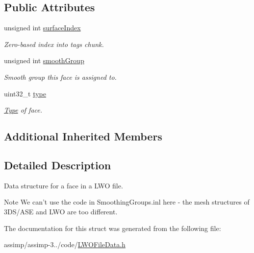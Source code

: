 \subsection*{Public Attributes}
\begin{DoxyCompactItemize}
\item 
\hypertarget{struct_assimp_1_1_l_w_o_1_1_face_ae5ac613bceddc7aaf7ac193f92315673}{unsigned int \hyperlink{struct_assimp_1_1_l_w_o_1_1_face_ae5ac613bceddc7aaf7ac193f92315673}{surface\+Index}}\label{struct_assimp_1_1_l_w_o_1_1_face_ae5ac613bceddc7aaf7ac193f92315673}

\begin{DoxyCompactList}\small\item\em Zero-\/based index into tags chunk. \end{DoxyCompactList}\item 
\hypertarget{struct_assimp_1_1_l_w_o_1_1_face_a7a18e1e72890583549f36d1fa4a023f8}{unsigned int \hyperlink{struct_assimp_1_1_l_w_o_1_1_face_a7a18e1e72890583549f36d1fa4a023f8}{smooth\+Group}}\label{struct_assimp_1_1_l_w_o_1_1_face_a7a18e1e72890583549f36d1fa4a023f8}

\begin{DoxyCompactList}\small\item\em Smooth group this face is assigned to. \end{DoxyCompactList}\item 
\hypertarget{struct_assimp_1_1_l_w_o_1_1_face_a7cc7b1645606341a7924a9057c3b8d47}{uint32\+\_\+t \hyperlink{struct_assimp_1_1_l_w_o_1_1_face_a7cc7b1645606341a7924a9057c3b8d47}{type}}\label{struct_assimp_1_1_l_w_o_1_1_face_a7cc7b1645606341a7924a9057c3b8d47}

\begin{DoxyCompactList}\small\item\em \hyperlink{struct_type}{Type} of face. \end{DoxyCompactList}\end{DoxyCompactItemize}
\subsection*{Additional Inherited Members}


\subsection{Detailed Description}
Data structure for a face in a L\+W\+O file. 

\begin{DoxyNote}{Note}
We can't use the code in Smoothing\+Groups.\+inl here -\/ the mesh structures of 3\+D\+S/\+A\+S\+E and L\+W\+O are too different. 
\end{DoxyNote}


The documentation for this struct was generated from the following file\+:\begin{DoxyCompactItemize}
\item 
assimp/assimp-\/3../code/\hyperlink{_l_w_o_file_data_8h}{L\+W\+O\+File\+Data.\+h}\end{DoxyCompactItemize}
